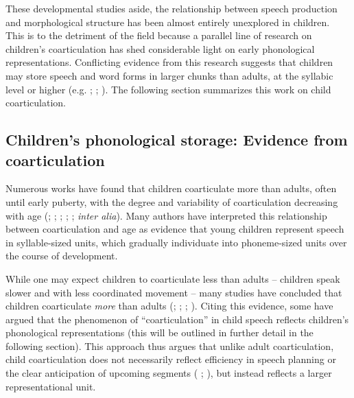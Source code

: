 \documentclass[a4paper,man,floatsintext,natbib,donotrepeattitle, apacite]{apa6}
\begin{document}
These developmental studies aside, the relationship between speech production and morphological structure has been almost entirely unexplored in children. This is to the detriment of the field because a parallel line of research on children's coarticulation has shed considerable light on early phonological representations. Conflicting evidence from this research suggests that children may store speech and word forms in larger chunks than adults, at the syllabic level or higher (e.g. \citealt{nittrouerEmergencePhoneticSegments1989};  \citealt{noirayBackFutureNonlinear2019}; \citealt{zharkovaCoarticulationIndicatorSpeech2011}). The following section summarizes this work on child coarticulation.

\subsection{Children's phonological storage: Evidence from coarticulation}

Numerous works have found that children coarticulate more than adults, often until early puberty, with the degree and variability of coarticulation decreasing with age (\citealt{goodellAcousticEvidenceDevelopment1992}; \citealt{nittrouerEmergencePhoneticSegments1989}; \citealt{nittrouerHowChildrenLearn1996}; \citealt{noirayBackFutureNonlinear2019};  \citealt{zharkovaSpatialTemporalLingual2014}; \citealt{zharkovaDynamicsVoicelessSibilant2018} \textit{inter alia}). Many authors have interpreted this relationship between coarticulation and age as evidence that young children represent speech in syllable-sized units, which gradually individuate into phoneme-sized units over the course of development. 

While one may expect children to coarticulate less than adults – children speak slower and with less coordinated movement \citep{smithStabilityPatterningSpeech1998} – many studies have concluded that children coarticulate \textit{more} than adults (\citealt{goodellAcousticEvidenceDevelopment1992}; \citealt{nittrouerEmergencePhoneticSegments1989}; \citealt{nittrouerHowChildrenLearn1996};  \citealt{zharkovaCoarticulationIndicatorSpeech2011}). Citing this evidence, some have argued that the phenomenon of ``coarticulation'' in child speech reflects children's phonological representations (this will be outlined in further detail in the following section). This approach thus argues that unlike adult coarticulation, child coarticulation does not necessarily reflect efficiency in speech planning or the clear anticipation of upcoming segments ( \citealt{bradlowConfluentTalkerListeneroriented2002}; \citealt{whalenCoarticulationLargelyPlanned1990}), but instead reflects a larger representational unit. 
\end{document}
